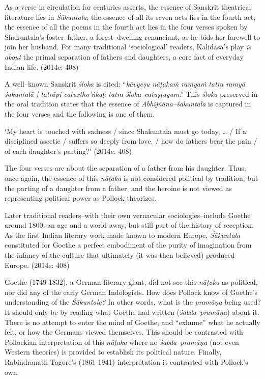 \begin{myquote}
As a verse in circulation for centuries asserts, the essence of Sanskrit theatrical literature lies in \textit{Śākuntala}; the essence of all its seven acts lies in the fourth act; the essence of all the poems in the fourth act lies in the four verses spoken by Shakuntala’s foster–father, a forest–dwelling renunciant, as he bids her farewell to join her husband. For many traditional ‘sociological’ readers, Kalidasa’s play \textit{is about} the primal separation of fathers and daughters, a core fact of everyday Indian life. (2014c: 408)
\end{myquote}

A well–known Sanskrit \textit{śloka} is cited: “\textit{kāvyeṣu nāṭakaṁ ramyaṁ tatra ramyā śakuntalā | tatrāpi caturtho'ṅkaḥ tatra śloka–catuṣṭayam}.” This \textit{śloka} preserved in the oral tradition states that the essence of \textit{Abhijñāna–śākuntala }is captured in the four verses and the following is one of them.

\begin{myquote}
‘My heart is touched with sadness / since Shakuntala must go today, … / If a disciplined ascetic / suffers so deeply from love, / how do fathers bear the pain / of each daughter’s parting?’ (2014c: 408)
\end{myquote}

The four verses are about the separation of a father from his daughter. Thus, once again, the essence of this \textit{nāṭaka }is not considered political by tradition, but the parting of a daughter from a father, and the heroine is not viewed as representing political power as Pollock theorizes.

\begin{myquote}
Later traditional readers–with their own vernacular sociologies–include Goethe around 1800, an age and a world away, but still part of the history of reception. As the first Indian literary work made known to modern Europe, \textit{Śākuntala} constituted for Goethe a perfect embodiment of the purity of imagination from the infancy of the culture that ultimately (it was then believed) produced Europe. (2014c: 408)
\end{myquote}

Goethe (1749-1832), a German literary giant, did not see this \textit{nāṭaka }as political, nor did any of the early German Indologists. How does Pollock know of Goethe’s understanding of the \textit{Śākuntala?} In other words, what is the \textit{pramāṇa} being used? It should only be by reading what Goethe had written (\textit{śabda–pramāṇa}) about it. There is no attempt to enter the mind of Goethe, and “exhume” what he actually felt, or how the Germans viewed themselves. This should be contrasted with Pollockian interpretation of this \textit{nāṭaka} where no \textit{śabda–pramāṇa }(not even Western theories) is provided to establish its political nature. Finally, Rabindranath Tagore’s (1861-1941) interpretation is contrasted with Pollock’s own.

